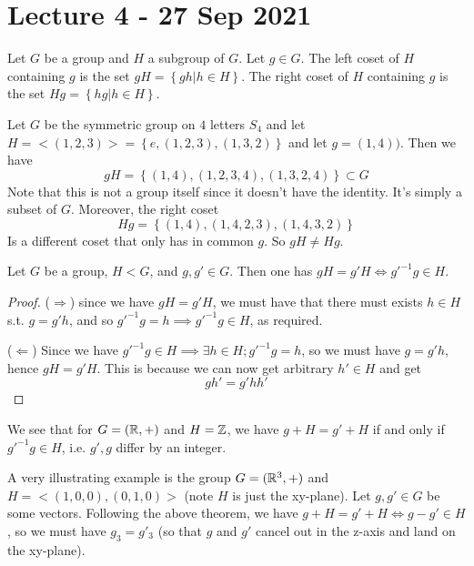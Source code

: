 \section{Lecture 4 - 27 Sep 2021}
\begin{definition}
  Let $G$ be a group and $H$ a subgroup of $G$. Let $g\in G$. The left coset of $H$
  containing $g$ is the set $gH=\left\{ gh | h\in H \right\}$. The right coset of $H$
  containing $g$ is the set $Hg=\left\{ hg | h\in H \right\}$.
  \label{coset}
\end{definition}

\begin{ex}
  Let $G$ be the symmetric group on $4$ letters $S_4$ and let $H=<(1,2,3)>=\left\{
e,(1,2,3), (1,3,2) \right\}$ and let $g=(1,4))$. Then we have 
\[gH = \left\{ (1,4), (1,2,3,4), (1,3,2,4) \right\} \subset G\]
Note that this is not a group itself since it doesn't have the identity. It's simply a
subset of $G$. Moreover, the right coset
\[Hg = \left\{ (1,4), (1,4,2,3), (1,4,3,2) \right\}\]
Is a different coset that only has in common $g$. So $gH\neq Hg$.
\end{ex}

\begin{theorem}
  Let $G$ be a group, $H<G$, and $g,g'\in G$. Then one has $gH=g'H \iff g'^{-1}g\in H$.
\end{theorem}
\begin{proof}
  ($\Rightarrow$) since we have $gH=g'H$, we must have that there must
  exists $h\in H$ s.t. $g=g'h$, and so $g'^{-1}g=h \implies g'^{-1}g\in H$, as required.

  ($\Leftarrow$) Since we have $g'^{-1}g\in H \implies \exists h\in H ; g'^{-1}g =h$, so
  we must have $g=g' h$, hence $gH=g'H$. This is because we can now get arbitrary $h'\in
  H$ and get \[gh'=g'hh'\] 
\end{proof}

\begin{example}
  We see that for $G=(\mathbb R,+)$ and $H=\mathbb Z$, we have $g+H=g'+H$ if and only if
  $g'^{-1}g\in H$, i.e.  $g',g$ differ by an integer.
\end{example}
\begin{example}
  A very illustrating example is the group $G=(\mathbb R^3, +)$ and $H=<(1,0,0),(0,1,0)>$ (note
  $H$ is just the xy-plane). Let $g,g'\in G$ be some vectors. Following the above theorem,
  we have $g+H=g'+H \iff g-g'\in H$, so we must have $g_3=g'_3$ (so that $g$ and $g'$
    cancel out in the z-axis and land on the xy-plane).
\end{example}

